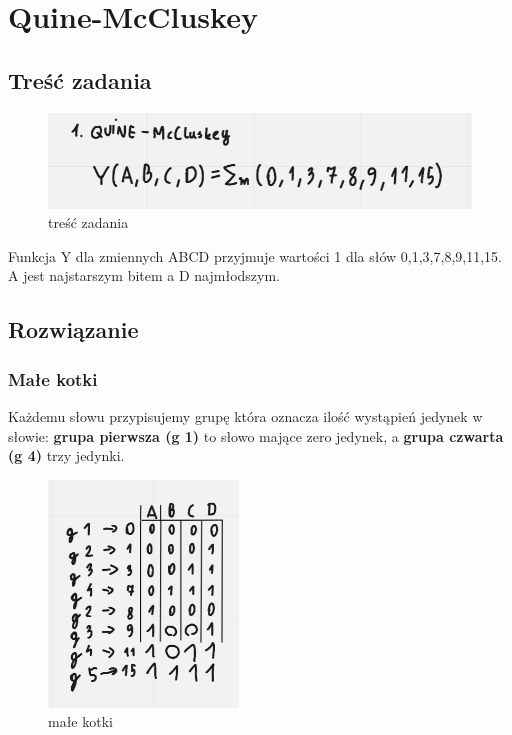 \section{Quine-McCluskey}

\subsection{Treść zadania}

\begin{figure}[h!]
    \centering
    \includegraphics[width=.8\textwidth]{images/qmc/qmc_ex.png}
    \caption{treść zadania}
    \label{fig:my_label}
\end{figure}

\vspace{0.5cm}

\raggedright

Funkcja Y dla zmiennych ABCD przyjmuje wartości 1 dla słów 0,1,3,7,8,9,11,15. A jest najstarszym bitem a D najmłodszym.

\subsection{Rozwiązanie}

\subsubsection{Małe kotki}

Każdemu słowu przypisujemy grupę która oznacza ilość wystąpień jedynek w słowie: \textbf{grupa pierwsza (g 1)} to słowo mające zero jedynek, a \textbf{grupa czwarta (g 4)} trzy jedynki.

\begin{figure}[h!]
    \centering
    \includegraphics[width=0.45\textwidth]{images/qmc/qmc_0.png}
    \caption{małe kotki}
    \label{fig:my_label}
\end{figure}

